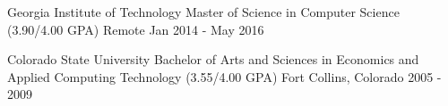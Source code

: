 

\begin{eduentries}

  \eduentry
    {Georgia Institute of Technology}
    {Master of Science in Computer Science (3.90/4.00 GPA)}
    {Remote}
    {Jan 2014 - May 2016}

  \eduentry
    {Colorado State University}
    {Bachelor of Arts and Sciences in Economics and Applied Computing Technology (3.55/4.00 GPA)}
    {Fort Collins, Colorado}
    {2005 - 2009}

\end{eduentries}